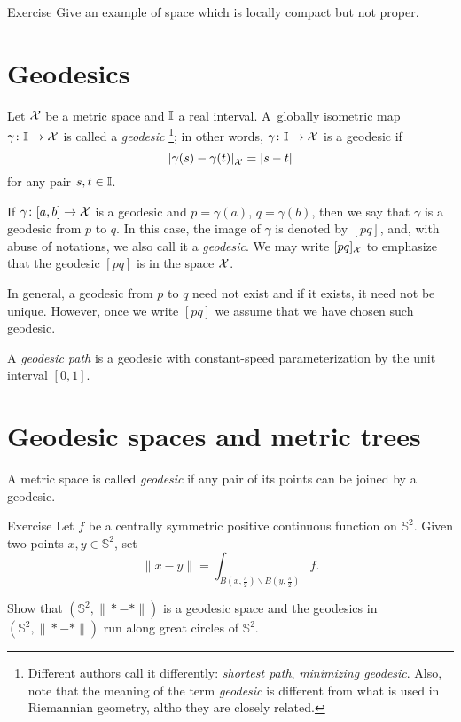 \begin{thm}{Exercise}\label{ex:loc-compact-not-proper}
Give an example of space which is locally compact but not proper.
\end{thm}

\section{Geodesics}
\label{sec:geods}

Let $\mathcal{X}$ be a metric space 
and $\II$\index{$\II$} a real interval. 
A~globally isometric map $\gamma\colon\mathbb{I}\to \mathcal{X}$ is called a \emph{geodesic}%
\footnote{Different authors call it differently: {}\emph{shortest path}, {}\emph{minimizing geodesic}.
Also, note that the meaning of the term \emph{geodesic} is different from what is used in Riemannian geometry, altho they are closely related.}; 
in other words, $\gamma\colon\mathbb{I}\to \mathcal{X}$ is a geodesic if 
\[\dist{\gamma(s)}{\gamma(t)}{\spc{X}}=|s-t|\]
for any pair $s,t\in \mathbb{I}$.

If $\gamma\colon[a,b]\to \mathcal{X}$ is a geodesic and $p=\gamma(a)$, $q=\gamma(b)$, then we say that $\gamma$ is a geodesic from $p$ to $q$.
In this case, the image of $\gamma$ is denoted by $[p q]$\index{$[{*}{*}]$}, and, with abuse of notations, we also call it a \emph{geodesic}.
We may write $[p q]_{\mathcal{X}}$ 
to emphasize that the geodesic $[p q]$ is in the space  ${\mathcal{X}}$.

In general, a geodesic from $p$ to $q$ need not exist and if it exists, it need not  be unique.  
However, once we write $[p q]$ we assume that we have chosen such geodesic.

A \emph{geodesic path} is a geodesic with constant-speed parameterization by the unit interval $[0,1]$.

\section{Geodesic spaces and metric trees}

A metric space is called \emph{geodesic} if any pair of its points can be joined by a geodesic.

\begin{thm}{Exercise}\label{ex:pogorelov}
Let $f$ be a centrally symmetric positive continuous function on $\mathbb{S}^2$.
Given two points $x,y\in \mathbb{S}^2$,
set 
\[\|x-y\|=\int_{B(x,\frac \pi2)\backslash B(y,\frac\pi2)}f.\]

Show that $(\mathbb{S}^2,\|{*}-{*}\|)$ is a geodesic space
and the geodesics in $(\mathbb{S}^2,\|{*}-{*}\|)$ run along great circles of $\mathbb{S}^2$.
\end{thm}

